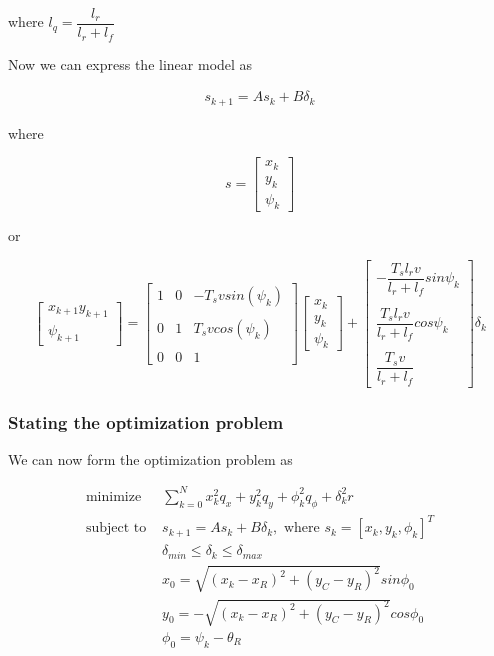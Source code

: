 where $l_q = \dfrac{l_r}{l_r + l_f}$




Now we can express the linear model as

\begin{align}
  s_{k+1} = A s_k + B \delta_k
\end{align}

where

\begin{equation}
  s=
  \begin{bmatrix}
    x_{k} \\
    y_{k} \\
    \psi_{k}
  \end{bmatrix}
\end{equation}

or

\begin{equation}
  \begin{bmatrix}
    x_{k+1}
    y_{k+1} \\
    \psi_{k+1}
  \end{bmatrix}
  =
  \begin{bmatrix}
    1 & 0 & -T_s v sin(\psi_k) \\\\
    0 & 1 & T_s v cos(\psi_k) \\\\
    0 & 0 & 1
  \end{bmatrix}
  \begin{bmatrix}
    x_{k} \\
    y_{k} \\
    \psi_{k}
  \end{bmatrix}
  +
  \begin{bmatrix}
    -\dfrac{T_s l_r v}{l_r + l_f} sin\psi_k \\\\
    \dfrac{T_s l_r v}{l_r + l_f} cos\psi_k \\\\
    \dfrac{T_s v}{l_r+l_f}
  \end{bmatrix}
  \delta_{k}
\end{equation}



\subsubsection{Stating the optimization problem}

We can now form the optimization problem as

\begin{align}
  \text{minimize }    & \sum\limits_{k=0}^N x_k^2 q_x + y_k^2 q_y + \phi_k^2 q_{\phi} + \delta_k^2 r \\
  \text{subject to }  & s_{k+1} = A s_k + B \delta_k,\text{ where } s_k = [x_k, y_k, \phi_k]^T \\
                      & \delta_{min} \leq \delta_k \leq \delta_{max} \\
                      & x_0 = \sqrt{(x_k - x_R)^2 + (y_C - y_R)^2} sin\phi_0 \\
                      & y_0 = -\sqrt{(x_k - x_R)^2 + (y_C - y_R)^2} cos\phi_0 \\
                      & \phi_0 = \psi_k - \theta_R
\end{align}
